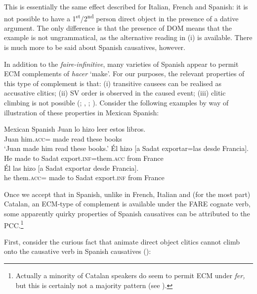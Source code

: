 \documentclass[output=paper,colorlinks,citecolor=brown,nonflat]{langsci/langscibook}
\begin{document}
This is essentially the same effect described for Italian, French and Spanish: it is not possible to have a 1\textsuperscript{st}/2\textsuperscript{nd} person direct object in the presence of a dative argument. The only difference is that the presence of DOM means that the example is not ungrammatical, as the alternative reading in (i) is available. There is much more to be said about Spanish causatives, however.

In addition to the \textit{faire-infinitive}, many varieties of Spanish appear to permit ECM complements of \textit{hacer} ‘make’. For our purposes, the relevant properties of this type of complement is that: (i) transitive causees can be realised as accusative clitics; (ii) SV order is observed in the caused event; (iii) clitic climbing is not possible (\citealt{Strozer1976}; \citealt{Treviño1992}, \citeyear{Treviño1993}; \citealt{Torrego2010, TubinoBlanco2011}). Consider the following examples by way of illustration of these properties in Mexican Spanish:

\ea%
    \label{ex:sheehan:32}
    Mexican Spanish \citep[311, 169]{Treviño1992}
    \ea\label{ex:sheehan:32a}
    \gll    Juan lo     hizo   leer   estos libros.\\
            Juan him\textsc{.acc}=  made   read   these books\\
    \glt    ‘Juan made him read these books.’
    \ex\label{ex:sheehan:32b}
    \gll    Él  hizo  [a   Sadat  exportar=las      desde   Francia].\\
            He  made    {\db}to   Sadat  export.\textsc{inf}=them.\textsc{acc}   from   France\\
    \ex\label{ex:sheehan:32c}
    \gll    *Él  las  hizo [a   Sadat   exportar   desde   Francia].\\
            he them.\textsc{acc}=   made   {\db}to Sadat   export.\textsc{inf} from   France\\
    \z
\z

Once we accept that in Spanish, unlike in French, Italian and (for the most part) Catalan, an ECM-type of complement is available under the FARE cognate verb, some apparently quirky properties of Spanish causatives can be attributed to the PCC.\footnote{Actually a minority of Catalan speakers do seem to permit ECM under \textit{fer,} but this is certainly not a majority pattern (see \citealt{PinedaSchifanoSheehan2018}).}

First, consider the curious fact that animate direct object clitics cannot climb onto the causative verb in Spanish causatives (\citealt{Rivas1977, Bordelois1988, Torrego2010}):
\end{document}
